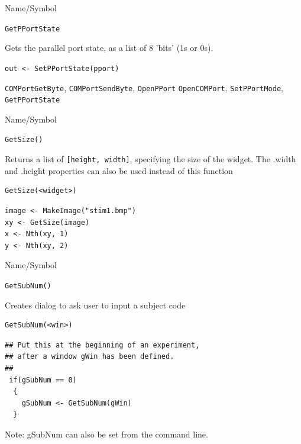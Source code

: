 \begin{desc}{Name/Symbol}
\item[Name/Symbol] \verb+GetPPortState+ 

\item[Description]  
  Gets the parallel port state, as a list of 8 'bits' (1s or 0s).
  
\item[Usage]       
     \verb+out <- SetPPortState(pport)+ 
\item[Example]


\item[See Also]
\verb+COMPortGetByte+, \verb+COMPortSendByte+, \verb+OpenPPort+ \verb+OpenCOMPort+, \verb+SetPPortMode+, \verb+GetPPortState+ 
\end{desc} 



\begin{desc}{Name/Symbol}
\item[Name/Symbol]	\verb+GetSize()+

\item[Description] Returns a list of \verb+[height, width]+,
  specifying the size of the widget.
  The .width and .height properties can also be used instead of this function

\item[Usage]
\begin{verbatim}
GetSize(<widget>)
\end{verbatim}

\item[Example]
\begin{verbatim}
image <- MakeImage("stim1.bmp")
xy <- GetSize(image)
x <- Nth(xy, 1)
y <- Nth(xy, 2)
\end{verbatim}

\item[See Also]	
\end{desc}

\begin{desc}{Name/Symbol}
\item[Name/Symbol]	\verb+GetSubNum()+

\item[Description]	Creates dialog to ask user to input a subject code

\item[Usage]
\begin{verbatim}
GetSubNum(<win>)
\end{verbatim}

\item[Example]

\begin{verbatim}
## Put this at the beginning of an experiment, 
## after a window gWin has been defined.
##
 if(gSubNum == 0)
  {
    gSubNum <- GetSubNum(gWin)
  }
\end{verbatim}
Note: gSubNum can also be set from the command line.
\item[See Also]
\end{desc}

